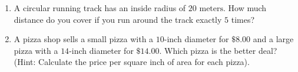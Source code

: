 \documentclass[12pt, letterpaper, fleqn]{article}
\begin{document}
\vspace{3mm}

\begin{enumerate}[itemsep=4.2cm, leftmargin=0.6cm, resume]
\item A circular running track has an inside radius of $20\text{ meters}$. How much distance do you cover if you run around the track exactly $5$ times?
\item A pizza shop sells a small pizza with a $10$-inch diameter for $\$8.00$ and a large pizza with a $14$-inch diameter for $\$14.00$. Which pizza is the better deal? (Hint: Calculate the price per square inch of area for each pizza).
\end{enumerate}
\end{document}
